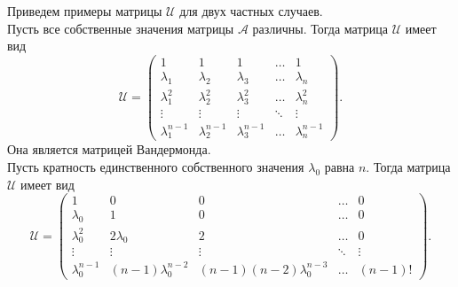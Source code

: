Приведем примеры матрицы $\mathcal{U}$ для двух частных случаев.  \\
Пусть все собственные значения матрицы $\mathcal{A}$ различны. Тогда матрица $\mathcal{U}$ имеет вид
$$
\mathcal{U} = 
\begin{pmatrix}
	1 & 1 & 1 & \dots & 1 \\
	\lambda_1 & \lambda_2 & \lambda_3 & \dots & \lambda_n \\
	\lambda_1 ^ 2 & \lambda_2 ^2 & \lambda_3 ^2 & \dots & \lambda_n ^2 \\
	\vdots & \vdots & \vdots & \ddots & \vdots \\
	\lambda_1 ^{n-1} & \lambda_2 ^{n-1} &\lambda_3 ^{n-1} & \dots & \lambda_n ^{n-1}
\end{pmatrix}.
$$
Она является матрицей Вандермонда. \\
Пусть кратность единственного собственного значения $\lambda_0$ равна $n$. Тогда матрица $\mathcal{U}$ имеет вид
$$
\mathcal{U} = 
\begin{pmatrix}
	1 & 0 & 0 & \dots & 0 \\
	\lambda_0 & 1 & 0 & \dots & 0 \\
	\lambda_0 ^ 2 & 2 \lambda_0 & 2 & \dots & 0 \\
	\vdots & \vdots & \vdots & \ddots & \vdots \\
	\lambda_0 ^{n-1} & (n-1)\lambda_0^{n-2} & (n-1)(n-2)\lambda_0^{n-3} & \dots & (n-1)!
\end{pmatrix}.
$$